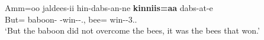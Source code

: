 \pagebreak
\begin{exe} \ex\label{BorEmphExa}
\raggedright
\gll Amm=oo jaldees-ii hin-dabs-an-ne \textbf{kinniis=aa} dabs-at-e\\
But=\lin{}  baboon-\nom{} \Neg{}-win-\Mid{}-\Neg{}.\pst{}, bee=\lin{} win-\Mid{}-3.\mas{}.\pst{}\\
\glt `But the baboon did not overcome the bees, it was the bees that won.'
\end{exe}

%
%
%
%
%
%


